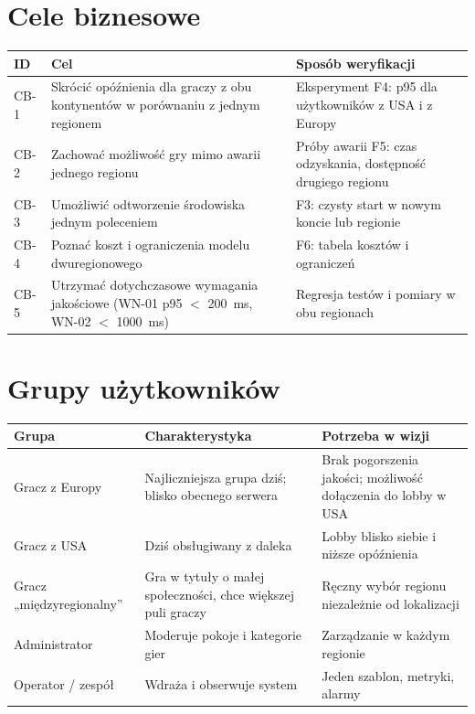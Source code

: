 \documentclass[12pt,a4paper]{article}
\begin{document}
\section{Cele biznesowe}
\begin{table}[H]
\centering\small
\begin{tabularx}{\textwidth}{@{}lYY@{}}
\toprule
\textbf{ID} & \textbf{Cel} & \textbf{Sposób weryfikacji} \\
\midrule
CB-1 & Skrócić opóźnienia dla graczy z obu kontynentów w porównaniu z jednym regionem & Eksperyment F4: p95 dla użytkowników z USA i z Europy \\
CB-2 & Zachować możliwość gry mimo awarii jednego regionu & Próby awarii F5: czas odzyskania, dostępność drugiego regionu \\
CB-3 & Umożliwić odtworzenie środowiska jednym poleceniem & F3: czysty start w nowym koncie lub regionie \\
CB-4 & Poznać koszt i ograniczenia modelu dwuregionowego & F6: tabela kosztów i ograniczeń \\
CB-5 & Utrzymać dotychczasowe wymagania jakościowe (WN-01 p95 $<$ 200~ms, WN-02 $<$ 1000~ms) & Regresja testów i pomiary w obu regionach \\
\bottomrule
\end{tabularx}
\end{table}

\section{Grupy użytkowników}
\begin{table}[H]
\centering\small
\begin{tabularx}{\textwidth}{@{}lYY@{}}
\toprule
\textbf{Grupa} & \textbf{Charakterystyka} & \textbf{Potrzeba w wizji} \\
\midrule
Gracz z Europy & Najliczniejsza grupa dziś; blisko obecnego serwera & Brak pogorszenia jakości; możliwość dołączenia do lobby w USA \\
Gracz z USA & Dziś obsługiwany z daleka & Lobby blisko siebie i niższe opóźnienia \\
Gracz „międzyregionalny'' & Gra w tytuły o małej społeczności, chce większej puli graczy & Ręczny wybór regionu niezależnie od lokalizacji \\
Administrator & Moderuje pokoje i kategorie gier & Zarządzanie w każdym regionie \\
Operator / zespół & Wdraża i obserwuje system & Jeden szablon, metryki, alarmy \\
\bottomrule
\end{tabularx}
\end{table}
\end{document}
